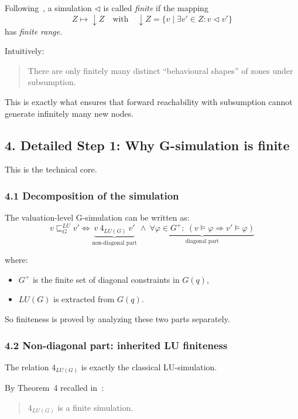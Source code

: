\documentclass{article}
\begin{document}
Following~\cite{GAbs}, a simulation $\triangleleft$
is called \emph{finite} if the mapping
\[
Z \longmapsto \downarrow Z
\quad\text{with}\quad
\downarrow Z = \{v \mid \exists v' \in Z : v \triangleleft v'\}
\]
has \emph{finite range}.

Intuitively:
\begin{quote}
There are only finitely many distinct ``behavioural shapes''
of zones under subsumption.
\end{quote}

This is exactly what ensures that forward reachability
with subsumption cannot generate infinitely many new nodes.


\subsection*{4. Detailed Step 1: Why G-simulation is finite}

This is the technical core.

\subsubsection*{4.1 Decomposition of the simulation}

The valuation-level G-simulation can be written as:
\[
v \sqsubseteq^{LU}_G v'
\iff
\underbrace{v\ 4_{LU(G)}\ v'}_{\text{non-diagonal part}}
\ \wedge\
\underbrace{
\forall \varphi \in G^+:\ (v\models\varphi \Rightarrow v'\models\varphi)
}_{\text{diagonal part}}
\]

where:
\begin{itemize}
  \item $G^+$ is the finite set of diagonal constraints in $G(q)$,
  \item $LU(G)$ is extracted from $G(q)$.
\end{itemize}

So finiteness is proved by analyzing these two parts separately.

\subsubsection*{4.2 Non-diagonal part: inherited LU finiteness}

The relation $4_{LU(G)}$ is exactly the classical LU-simulation.

By Theorem~4 recalled in~\cite{GAbs}:
\begin{quote}
$4_{LU(G)}$ is a finite simulation.
\end{quote}
\end{document}
